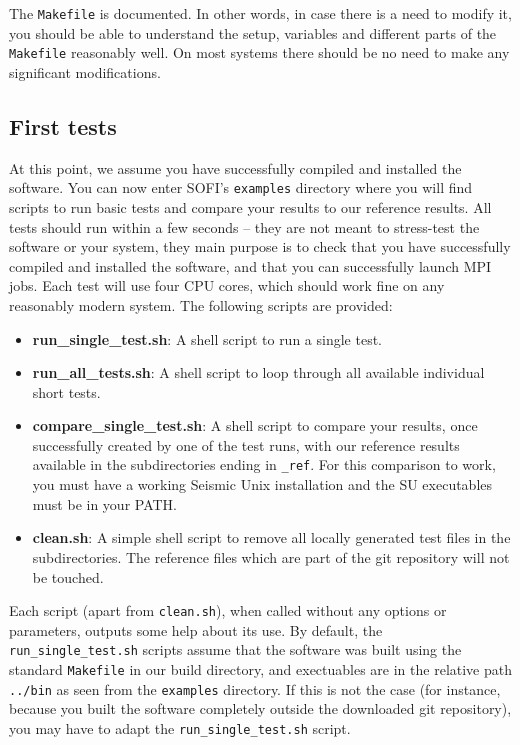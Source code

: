 \documentclass[11pt,english,a4paper]{article}
\begin{document}
The \texttt{Makefile} is documented. In other words, in case there is a need to modify it, you should be able to understand the setup, variables and different parts of the \texttt{Makefile} reasonably well. On most systems there should be no need to make any significant modifications.

\subsection{First tests}
\label{qguide}
At this point, we assume you have successfully compiled and installed the software. You can now enter SOFI's \texttt{examples} directory where you will find scripts to run basic tests and compare your results to our reference results. All tests should run within a few seconds -- they are not meant to stress-test the software or your system, they main purpose is to check that you have successfully compiled and installed the software, and that you can successfully launch MPI jobs. Each test will use four CPU cores, which should work fine on any reasonably modern system. The following scripts are provided:
\begin{itemize}
\item \textbf{run\_single\_test.sh}: A shell script to run a single test.
\item \textbf{run\_all\_tests.sh}: A shell script to loop through all available individual short tests.
\item \textbf{compare\_single\_test.sh}: A shell script to compare your results, once successfully created by one of the test runs, with our reference results available in the subdirectories ending in \texttt{\_ref}. For this comparison to work, you must have a working Seismic Unix installation and the SU executables must be in your PATH.
\item \textbf{clean.sh}: A simple shell script to remove all locally generated test files in the subdirectories. The reference files which are part of the git repository will not be touched.
\end{itemize}
Each script (apart from \texttt{clean.sh}), when called without any options or parameters, outputs some help about its use. By default, the \texttt{run\_single\_test.sh} scripts assume that the software was built using the standard \texttt{Makefile} in our build directory, and exectuables are in the relative path \texttt{../bin} as seen from the \texttt{examples} directory. If this is not the case (for instance, because you built the software completely outside the downloaded git repository), you may have to adapt the \texttt{run\_single\_test.sh} script.
\end{document}

